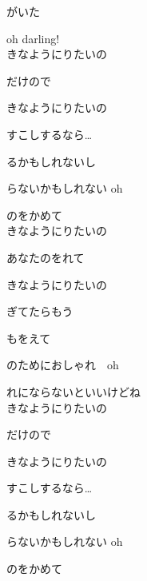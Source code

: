 {がいた

oh darling!
\\

きなようにりたいの

だけので

きなようにりたいの

すこしするなら…

るかもしれないし

らないかもしれない oh

のをかめて
\\

きなようにりたいの

あなたのをれて

きなようにりたいの

ぎてたらもう

もをえて

のためにおしゃれ　oh

れにならないといいけどね
\\

きなようにりたいの

だけので

きなようにりたいの

すこしするなら…

るかもしれないし

らないかもしれない oh

のをかめて

}